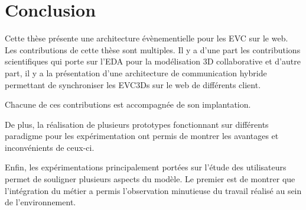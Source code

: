 \chapter{Conclusion}
\chaptertable

Cette thèse présente une architecture évènementielle pour les \gls{EVC} sur le 
web. Les contributions de cette thèse sont multiples. Il y a d'une part les 
contributions scientifiques qui porte sur l'\gls{EDA} pour la 
modélisation 3D collaborative et d'autre part, il y a la présentation d'une 
architecture de communication hybride permettant de synchroniser les 
\glspl{EVC3D} sur le web de différents client.

Chacune de ces contributions est accompagnée de son implantation. 

De plus, la réalisation de plusieurs prototypes fonctionnant sur différents 
paradigme pour les expérimentation ont permis de montrer les avantages et 
inconvénients de ceux-ci.

Enfin, les expérimentations principalement portées sur l'étude des utilisateurs 
permet de souligner plusieurs aspects du modèle. Le premier est de montrer que 
l'intégration du métier a permis l'observation minutieuse du travail réalisé au sein 
de l'environnement. 